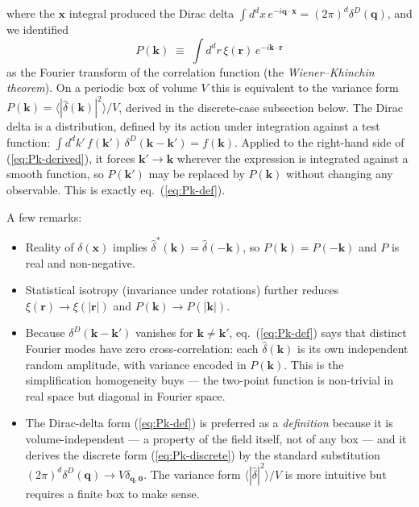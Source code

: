 \documentclass[12pt]{article}
\begin{document}
where the $\mathbf x$ integral produced the Dirac delta
$\int d^dx\,e^{-i\mathbf q\cdot\mathbf x}=(2\pi)^d\delta^D(\mathbf q)$,
and we identified
\begin{equation}\label{eq:P-xi-FT}
  P(\mathbf k) \;\equiv\; \int d^dr\,\xi(\mathbf r)\,e^{-i\mathbf k\cdot\mathbf r}
\end{equation}
as the Fourier transform of the correlation function (the
\emph{Wiener--Khinchin theorem}). On a periodic box of volume $V$
this is equivalent to the variance form $P(\mathbf
k)=\langle|\hat\delta(\mathbf k)|^2\rangle/V$, derived in the
discrete-case subsection below. The Dirac delta is a distribution,
defined by its action under integration against a test function:
$\int d^dk'\,f(\mathbf k')\,\delta^D(\mathbf k-\mathbf k') = f(\mathbf
k)$. Applied to the right-hand side of (\ref{eq:Pk-derived}), it
forces $\mathbf k'\to\mathbf k$ wherever the expression is integrated
against a smooth function, so $P(\mathbf k')$ may be replaced by
$P(\mathbf k)$ without changing any observable. This is exactly
eq.~(\ref{eq:Pk-def}).

A few remarks:
\begin{itemize}
\item Reality of $\delta(\mathbf x)$ implies $\hat\delta^*(\mathbf
k)=\hat\delta(-\mathbf k)$, so $P(\mathbf k)=P(-\mathbf k)$ and
$P$ is real and non-negative.
\item Statistical isotropy (invariance under rotations) further
reduces $\xi(\mathbf r)\to\xi(|\mathbf r|)$ and $P(\mathbf k)\to
P(|\mathbf k|)$.
\item Because $\delta^D(\mathbf k-\mathbf k')$ vanishes for $\mathbf
k\ne\mathbf k'$, eq.~(\ref{eq:Pk-def}) says that distinct Fourier
modes have zero cross-correlation: each $\hat\delta(\mathbf k)$ is
its own independent random amplitude, with variance encoded in
$P(\mathbf k)$. This is the simplification homogeneity buys ---
the two-point function is non-trivial in real space but diagonal
in Fourier space.
\item The Dirac-delta form (\ref{eq:Pk-def}) is preferred as a
\emph{definition} because it is volume-independent --- a property
of the field itself, not of any box --- and it derives the
discrete form (\ref{eq:Pk-discrete}) by the standard substitution
$(2\pi)^d\delta^D(\mathbf q)\to V\delta_{\mathbf q,\mathbf 0}$.
The variance form $\langle|\hat\delta|^2\rangle/V$ is more
intuitive but requires a finite box to make sense.
\end{itemize}
\end{document}
